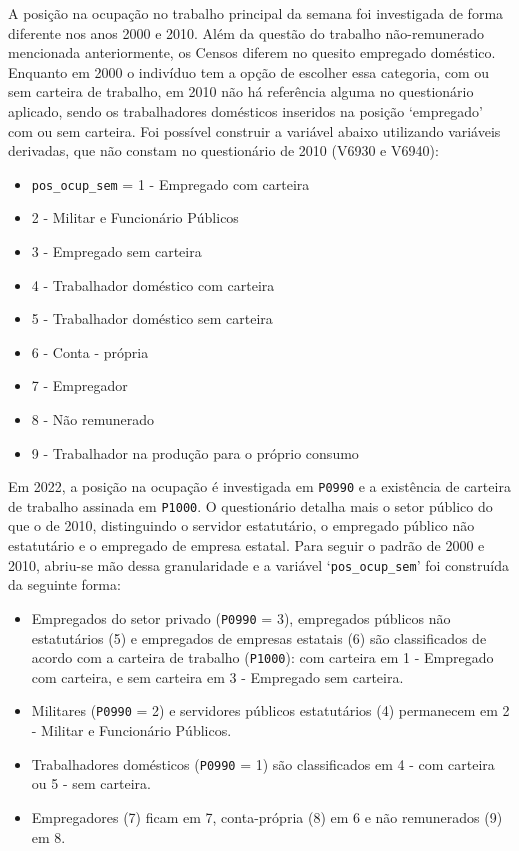 \documentclass[12pt,a4paper]{article}
\newcommand{\vr}[1]{\texttt{#1}}
\begin{document}
A posição na ocupação no trabalho principal da semana foi investigada de forma diferente nos anos 2000 e 2010. Além da questão do trabalho não-remunerado mencionada anteriormente, os Censos diferem no quesito empregado doméstico. Enquanto em 2000 o indivíduo tem a opção de escolher essa categoria, com ou sem carteira de trabalho, em 2010 não há referência alguma no questionário aplicado, sendo os trabalhadores domésticos inseridos na posição ‘empregado’ com ou sem carteira. Foi possível construir a variável abaixo utilizando variáveis derivadas, que não constam no questionário de 2010 (V6930 e V6940):
\begin{itemize}
  \item \vr{pos\_ocup\_sem} = 1 - Empregado com carteira
  \item 2 - Militar e Funcionário Públicos
  \item 3 - Empregado sem carteira
  \item 4 - Trabalhador doméstico com carteira
  \item 5 - Trabalhador doméstico sem carteira
  \item 6 - Conta - própria
  \item 7 - Empregador
  \item 8 - Não remunerado
  \item 9 - Trabalhador na produção para o próprio consumo
\end{itemize}

Em 2022, a posição na ocupação é investigada em \vr{P0990} e a existência de carteira de trabalho assinada em \vr{P1000}. O questionário detalha mais o setor público do que o de 2010, distinguindo o servidor estatutário, o empregado público não estatutário e o empregado de empresa estatal. Para seguir o padrão de 2000 e 2010, abriu-se mão dessa granularidade e a variável ‘\vr{pos\_ocup\_sem}’ foi construída da seguinte forma:
\begin{itemize}
  \item Empregados do setor privado (\vr{P0990} = 3), empregados públicos não estatutários (5) e empregados de empresas estatais (6) são classificados de acordo com a carteira de trabalho (\vr{P1000}): com carteira em 1 - Empregado com carteira, e sem carteira em 3 - Empregado sem carteira.
  \item Militares (\vr{P0990} = 2) e servidores públicos estatutários (4) permanecem em 2 - Militar e Funcionário Públicos.
  \item Trabalhadores domésticos (\vr{P0990} = 1) são classificados em 4 - com carteira ou 5 - sem carteira.
  \item Empregadores (7) ficam em 7, conta-própria (8) em 6 e não remunerados (9) em 8.
\end{itemize}
\end{document}
